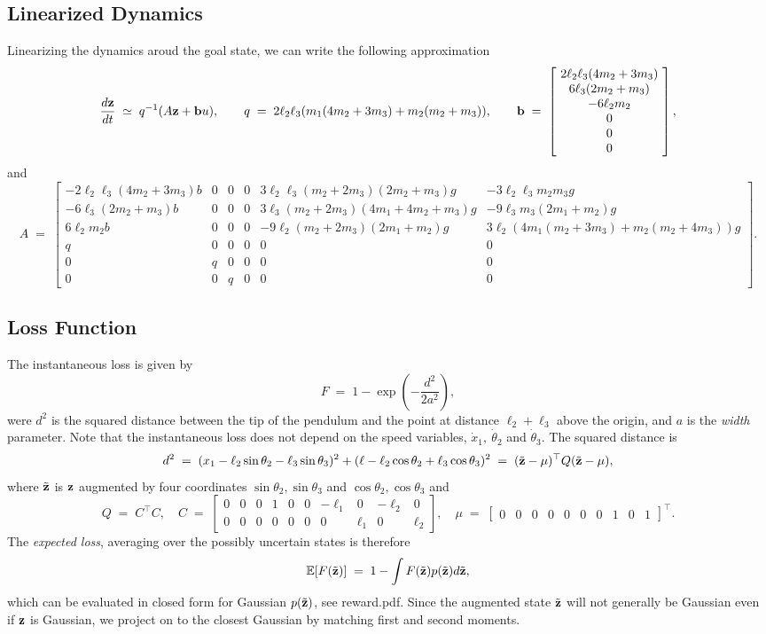 \documentclass{article}
\newcommand{\bfb}{{\bf b}}
\newcommand{\bfz}{{\bf z}}
\newcommand{\E}{{\mathbb E}}
\begin{document}
\subsection*{Linearized Dynamics}

Linearizing the dynamics aroud the goal state, we can write the
following approximation
\[
\frac{d\bfz}{dt}\;\simeq\;q^{-1}(A\bfz+\bfb u),\qquad
q\;=\;2\ell_2\ell_3(m_1(4m_2+3m_3)+m_2(m_2+m_3)),\qquad
\bfb\;=\;\left[\!\begin{array}{c}
2\ell_2\ell_3(4m_2+3m_3)\\ 6\ell_3(2m_2+m_3)\\ -6\ell_2m_2\\ 0\\ 0\\ 0
\end{array}\!\right],
\]
 and
\[
A\;=\;\left[\!\begin{array}{cccccc}

-2\ell_2\ell_3(4m_2\!+\!3m_3)b&0&0&0&3\ell_2\ell_3(m_2+2m_3)(2m_2+m_3)g&-3\ell_2\ell_3m_2m_3g\\
-6\ell_3(2m_2+m_3)b&0&0&0&3\ell_3(m_2\!+\!2m_3)(4m_1\!+\!4m_2\!+\!m_3)g&-9\ell_3m_3(2m_1+m_2)g\\
6\ell_2m_2b&0&0&0&-9\ell_2(m_2+2m_3)(2m_1+m_2)g&\!\!\!3\ell_2(4m_1(m_2\!+\!3m_3)\!+\!m_2(m_2\!+\!4m_3))g\!\!\!\\
q&0&0&0&0&0\\
0&q&0&0&0&0\\
0&0&q&0&0&0\end{array}\!\right].
\]

\subsection*{Loss Function}

The instantaneous loss is given by
\[
F\;=\;1-\exp(-\frac{d^2}{2a^2}),
\]
were $d^2$ is the squared distance between the tip of the pendulum and
the point at distance $\ell_2 + \ell_3$ above the origin, and $a$ is the
\emph{width} parameter. Note that the instantaneous loss does not
depend on the speed variables, $\dot x_1,\ \dot\theta_2$ and $\dot\theta_3$. The
squared distance is
\[
d^2\;=\;(x_1-\ell_2\sin\theta_2-\ell_3\sin\theta_3)^2+(\ell-\ell_2\cos\theta_2+\ell_3\cos\theta_3)^2
\;=\;(\tilde\bfz-\mu)^\top Q(\tilde\bfz-\mu),
\]
where $\tilde\bfz$ is $\bfz$ augmented by four coordinates $\sin\theta_2, \sin\theta_3$ and
$\cos\theta_2, \cos\theta_3$ and
\[
Q\;=\;C^\top C,\quad
C\;=\;\begin{bmatrix}0& 0 & 0 & 1 & 0 & 0 & -\ell_1 & 0 & -\ell_2 & 0\\ 0&0& 0 & 0 & 0 & 0 & 0 & \ell_1 & 0 & \ell_2 \end{bmatrix},\quad
\mu\;=\;\begin{bmatrix}0&0&0&0&0&0&0&1&0&1\end{bmatrix}^\top.
\]
The \emph{expected loss}, averaging over the possibly uncertain states
is therefore
\[
\E[F(\tilde\bfz)]\;=\;1-\int F(\tilde\bfz)p(\tilde\bfz)d\tilde\bfz,
\]
which can be evaluated in closed form for Gaussian $p(\tilde\bfz)$, see
reward.pdf. Since the augmented state $\tilde\bfz$ will not generally
be Gaussian even if $\bfz$ is Gaussian, we project on to the closest
Gaussian by matching first and second moments.
\end{document}

